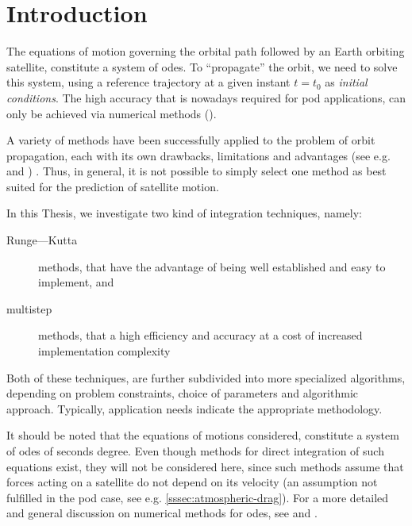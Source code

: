 \section{Introduction}\label{sec:integration-introduction}

The equations of motion governing the orbital path followed by an Earth orbiting 
satellite, constitute a system of \glspl{ode}. To ``propagate'' the orbit, we need 
to solve this system, using a reference trajectory at a given instant $t=t_0$ as 
\emph{initial conditions}. The high accuracy that is nowadays required for \gls{pod} 
applications, can only be achieved via numerical methods (\cite{Montenbruck2000}).

A variety of methods have been successfully applied to the problem of orbit 
propagation, each with its own drawbacks, limitations and advantages (see e.g. 
\cite{Somodi2011} and \cite{Papanikolaou2016})
. Thus, in 
general, it is not possible to simply select one method as best suited for the 
prediction of satellite motion.

In this Thesis, we investigate two kind of integration techniques, namely:
\begin{description}
    \item[Runge—Kutta] methods, that have the advantage of being well established 
      and easy to implement, and
    \item[multistep] methods, that a high efficiency and accuracy at a cost of 
      increased implementation complexity
\end{description}
Both of these techniques, are further subdivided into more specialized algorithms, 
depending on problem constraints, choice of parameters and algorithmic approach. 
Typically, application needs indicate the appropriate methodology.

It should be noted that the equations of motions considered, constitute a system 
of \glspl{ode} of seconds degree. Even though methods for direct integration of 
such equations exist, they will not be considered here, since such methods assume 
that forces acting on a satellite do not depend on its velocity (an assumption not 
fulfilled in the \gls{pod} case, see e.g. \autoref{sssec:atmospheric-drag}).
For a more detailed and general discussion on numerical methods for \glspl{ode}, 
see \cite{Hairer2009I} and \cite{Hairer2010II}.

